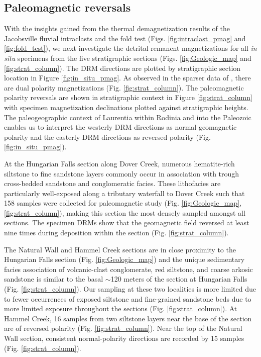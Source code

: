 \documentclass[draft]{agujournal2019}
\begin{document}
\subsection*{Paleomagnetic reversals}

With the insights gained from the thermal demagnetization results of the Jacobsville fluvial intraclasts and the fold test (Figs. \ref{fig:intraclast_pmag} and \ref{fig:fold_test}), we next investigate the detrital remanent magnetizations for all \textit{in situ} specimens from the five stratigraphic sections (Figs. \ref{fig:Geologic_map} and \ref{fig:strat_column}). The DRM directions are plotted by stratigraphic section location in Figure \ref{fig:in_situ_pmag}. As observed in the sparser data of , there are dual polarity magnetizations (Fig. \ref{fig:strat_column}). The paleomagnetic polarity reversals are shown in stratigraphic context in Figure \ref{fig:strat_column} with specimen magnetization declinations plotted against stratigraphic heights. The paleogeographic context of Laurentia within Rodinia and into the Paleozoic enables us to interpret the westerly DRM directions as normal geomagnetic polarity and the easterly DRM directions as reversed polarity (Fig. \ref{fig:in_situ_pmag}). 

At the Hungarian Falls section along Dover Creek, numerous hematite-rich siltstone to fine sandstone layers commonly occur in association with trough cross-bedded sandstone and conglomeratic facies. These lithofacies are particularly well-exposed along a tributary waterfall to Dover Creek such that 158 samples were collected for paleomagnetic study (Fig. \ref{fig:Geologic_map}, \ref{fig:strat_column}), making this section the most densely sampled amongst all sections. The specimen DRMs show that the geomagnetic field reversed at least nine times during deposition within the section (Fig. \ref{fig:strat_column}). 

The Natural Wall and Hammel Creek sections are in close proximity to the Hungarian Falls section (Fig. \ref{fig:Geologic_map}) and the unique sedimentary facies association of volcanic-clast conglomerate, red siltstone, and coarse arkosic sandstone is similar to the basal $\sim$120 meters of the section at Hungarian Falls (Fig. \ref{fig:strat_column}). Our sampling at these two localities is more limited due to fewer occurrences of exposed siltstone and fine-grained sandstone beds due to more limited exposure throughout the sections (Fig. \ref{fig:strat_column}). At Hammel Creek, 16 samples from two siltstone layers near the base of the section are of reversed polarity (Fig. \ref{fig:strat_column}). Near the top of the Natural Wall section, consistent normal-polarity directions are recorded by 15 samples (Fig. \ref{fig:strat_column}). 
\end{document}
